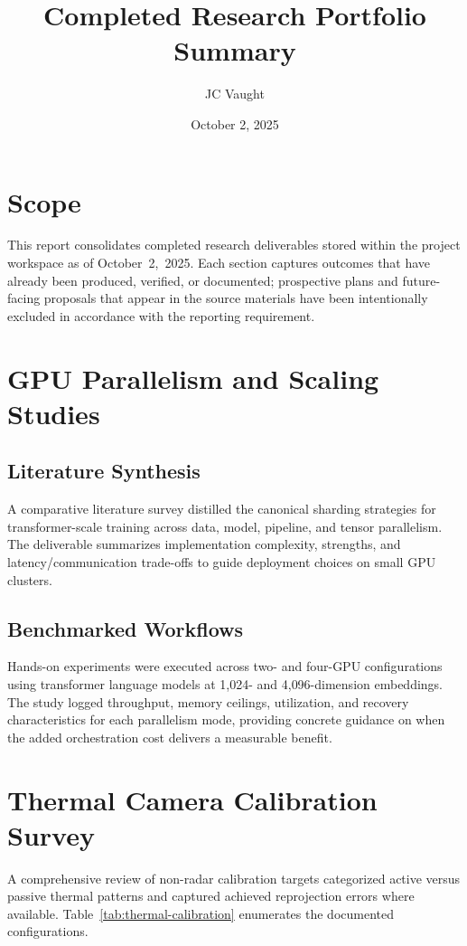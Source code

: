 \documentclass[12pt]{article}
\title{Completed Research Portfolio Summary}
\author{JC Vaught}
\date{October 2, 2025}
\begin{document}
\maketitle
\section*{Scope}
This report consolidates completed research deliverables stored within the project workspace as of October~2,~2025. Each section captures outcomes that have already been produced, verified, or documented; prospective plans and future-facing proposals that appear in the source materials have been intentionally excluded in accordance with the reporting requirement.

\section{GPU Parallelism and Scaling Studies}
\subsection{Literature Synthesis}
A comparative literature survey distilled the canonical sharding strategies for transformer-scale training across data, model, pipeline, and tensor parallelism. The deliverable summarizes implementation complexity, strengths, and latency/communication trade-offs to guide deployment choices on small GPU clusters.\cite{gpu-summary-table}

\subsection{Benchmarked Workflows}
Hands-on experiments were executed across two- and four-GPU configurations using transformer language models at 1{,}024- and 4{,}096-dimension embeddings. The study logged throughput, memory ceilings, utilization, and recovery characteristics for each parallelism mode, providing concrete guidance on when the added orchestration cost delivers a measurable benefit.\cite{gpu-weekly-brief}

\section{Thermal Camera Calibration Survey}
A comprehensive review of non-radar calibration targets categorized active versus passive thermal patterns and captured achieved reprojection errors where available.\cite{thermal-summary} Table~\ref{tab:thermal-calibration} enumerates the documented configurations.
\end{document}
